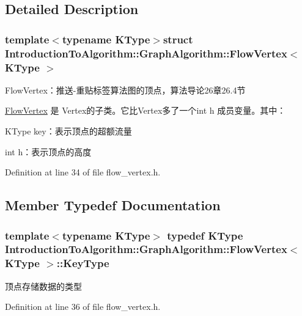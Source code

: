 \subsection{Detailed Description}
\subsubsection*{template$<$typename K\+Type$>$struct Introduction\+To\+Algorithm\+::\+Graph\+Algorithm\+::\+Flow\+Vertex$<$ K\+Type $>$}

Flow\+Vertex：推送-\/重贴标签算法图的顶点，算法导论26章26.4节 

\hyperlink{struct_introduction_to_algorithm_1_1_graph_algorithm_1_1_flow_vertex}{Flow\+Vertex} 是 Vertex的子类。它比\+Vertex多了一个{\ttfamily int h} 成员变量。其中：


\begin{DoxyItemize}
\item {\ttfamily K\+Type key}：表示顶点的超额流量
\item {\ttfamily int h}：表示顶点的高度 
\end{DoxyItemize}

Definition at line 34 of file flow\+\_\+vertex.\+h.



\subsection{Member Typedef Documentation}
\hypertarget{struct_introduction_to_algorithm_1_1_graph_algorithm_1_1_flow_vertex_a014b25c20124a24525ef7db0588466b9}{}
\subsubsection[{Key\+Type}]{\setlength{\rightskip}{0pt plus 5cm}template$<$typename K\+Type$>$ typedef K\+Type {\bf Introduction\+To\+Algorithm\+::\+Graph\+Algorithm\+::\+Flow\+Vertex}$<$ K\+Type $>$\+::{\bf Key\+Type}}\label{struct_introduction_to_algorithm_1_1_graph_algorithm_1_1_flow_vertex_a014b25c20124a24525ef7db0588466b9}
顶点存储数据的类型 

Definition at line 36 of file flow\+\_\+vertex.\+h.

